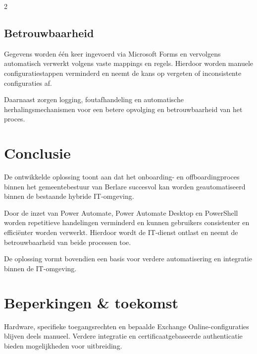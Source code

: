 \documentclass[a0,portrait]{hogent-poster}
\begin{document}
\begin{multicols}{2}
\vspace{8pt}

\subsection{Betrouwbaarheid}

Gegevens worden één keer ingevoerd via Microsoft Forms en vervolgens
automatisch verwerkt volgens vaste mappings en regels. Hierdoor worden
manuele configuratiestappen verminderd en neemt de kans op vergeten of
inconsistente configuraties af.

Daarnaast zorgen logging, foutafhandeling en automatische
herhalingsmechanismen voor een betere opvolging en betrouwbaarheid van
het proces.

\section{Conclusie}

De ontwikkelde oplossing toont aan dat het onboarding- en offboardingproces binnen het gemeentebestuur van Berlare succesvol kan worden geautomatiseerd binnen de bestaande hybride IT-omgeving.

Door de inzet van Power Automate, Power Automate Desktop en PowerShell worden repetitieve handelingen verminderd en kunnen gebruikers consistenter en efficiënter worden verwerkt. Hierdoor wordt de IT-dienst ontlast en neemt de betrouwbaarheid van beide processen toe.

De oplossing vormt bovendien een basis voor verdere automatisering en integratie binnen de IT-omgeving.

\section{Beperkingen \& toekomst}
Hardware, specifieke toegangsrechten en bepaalde Exchange Online-configuraties blijven deels manueel. Verdere integratie en certificaatgebaseerde authenticatie bieden mogelijkheden voor uitbreiding.

\end{multicols}
\end{document}
